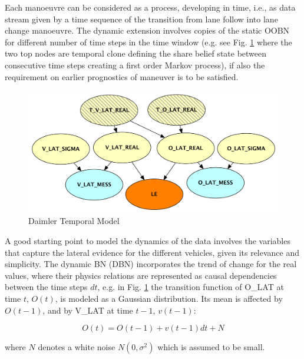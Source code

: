 Each manoeuvre can be considered as a process, developing in time, i.e., as data stream given by a time sequence of the transition from lane follow into lane change manoeuvre. The dynamic extension involves copies of the static OOBN for different number of time steps in the time window (e.g. see Fig. \ref{Figure:daimlerLEdyn} where the two top nodes are temporal clone defining the share belief state between consecutive time steps creating a first order Markov process), if also the requirement on earlier prognostics of maneuver is to be satisfied. 

\begin{figure}
\begin{center}
\includegraphics[scale=0.5]{./figures/DaimlerLEdyn.pdf}
\end{center}
\caption{\label{Figure:daimlerLEdyn}Daimler Temporal Model}
\end{figure}


A good starting point to model the dynamics of the data involves the variables that capture the lateral evidence for the different vehicles, given its relevance and simplicity. 
The dynamic BN (DBN) incorporates the trend of change for the real values, where their physics relations are represented as causal dependencies between the time steps $dt$, e.g. in Fig. \ref{Figure:daimlerLEdyn} the transition function of O\_LAT at time $t$, $O(t)$, is modeled as a Gaussian distribution. Its mean is affected by $O(t-1)$, and by V\_LAT at time $t-1$, $v(t-1)$:

\begin{equation}
O(t) =O(t-1) +v(t-1)dt +N
\end{equation}

where $N$ denotes a white noise $N(0,\sigma^2)$ which is assumed to be small.

